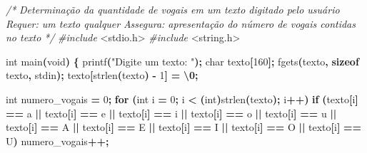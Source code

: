 \documentclass[
  11pt,
  a4paper,
]{scrbook}
\newenvironment{Shaded}{\begin{snugshade}}{\end{snugshade}}
\newcommand{\CharTok}[1]{\textcolor[rgb]{0.31,0.60,0.02}{#1}}
\newcommand{\CommentTok}[1]{\textcolor[rgb]{0.56,0.35,0.01}{\textit{#1}}}
\newcommand{\ControlFlowTok}[1]{\textcolor[rgb]{0.13,0.29,0.53}{\textbf{#1}}}
\newcommand{\DataTypeTok}[1]{\textcolor[rgb]{0.13,0.29,0.53}{#1}}
\newcommand{\DecValTok}[1]{\textcolor[rgb]{0.00,0.00,0.81}{#1}}
\newcommand{\ImportTok}[1]{#1}
\newcommand{\KeywordTok}[1]{\textcolor[rgb]{0.13,0.29,0.53}{\textbf{#1}}}
\newcommand{\NormalTok}[1]{#1}
\newcommand{\OperatorTok}[1]{\textcolor[rgb]{0.81,0.36,0.00}{\textbf{#1}}}
\newcommand{\PreprocessorTok}[1]{\textcolor[rgb]{0.56,0.35,0.01}{\textit{#1}}}
\newcommand{\SpecialCharTok}[1]{\textcolor[rgb]{0.81,0.36,0.00}{\textbf{#1}}}
\newcommand{\StringTok}[1]{\textcolor[rgb]{0.31,0.60,0.02}{#1}}
\begin{document}
\begin{Shaded}
\begin{Highlighting}[]
\CommentTok{/*}
\CommentTok{Determinação da quantidade de vogais em um texto digitado pelo usuário}
\CommentTok{Requer: um texto qualquer}
\CommentTok{Assegura: apresentação do número de vogais contidas no texto}
\CommentTok{*/}
\PreprocessorTok{\#include }\ImportTok{\textless{}stdio.h\textgreater{}}
\PreprocessorTok{\#include }\ImportTok{\textless{}string.h\textgreater{}}

\DataTypeTok{int}\NormalTok{ main}\OperatorTok{(}\DataTypeTok{void}\OperatorTok{)} \OperatorTok{\{}
\NormalTok{    printf}\OperatorTok{(}\StringTok{"Digite um texto: "}\OperatorTok{);}
    \DataTypeTok{char}\NormalTok{ texto}\OperatorTok{[}\DecValTok{160}\OperatorTok{];}
\NormalTok{    fgets}\OperatorTok{(}\NormalTok{texto}\OperatorTok{,} \KeywordTok{sizeof}\NormalTok{ texto}\OperatorTok{,}\NormalTok{ stdin}\OperatorTok{);}
\NormalTok{    texto}\OperatorTok{[}\NormalTok{strlen}\OperatorTok{(}\NormalTok{texto}\OperatorTok{)} \OperatorTok{{-}} \DecValTok{1}\OperatorTok{]} \OperatorTok{=} \CharTok{\textquotesingle{}}\SpecialCharTok{\textbackslash{}0}\CharTok{\textquotesingle{}}\OperatorTok{;}

    \DataTypeTok{int}\NormalTok{ numero\_vogais }\OperatorTok{=} \DecValTok{0}\OperatorTok{;}
    \ControlFlowTok{for} \OperatorTok{(}\DataTypeTok{int}\NormalTok{ i }\OperatorTok{=} \DecValTok{0}\OperatorTok{;}\NormalTok{ i }\OperatorTok{\textless{}} \OperatorTok{(}\DataTypeTok{int}\OperatorTok{)}\NormalTok{strlen}\OperatorTok{(}\NormalTok{texto}\OperatorTok{);}\NormalTok{ i}\OperatorTok{++)}
        \ControlFlowTok{if} \OperatorTok{(}\NormalTok{texto}\OperatorTok{[}\NormalTok{i}\OperatorTok{]} \OperatorTok{==} \CharTok{\textquotesingle{}a\textquotesingle{}} \OperatorTok{||}\NormalTok{ texto}\OperatorTok{[}\NormalTok{i}\OperatorTok{]} \OperatorTok{==} \CharTok{\textquotesingle{}e\textquotesingle{}} \OperatorTok{||}\NormalTok{ texto}\OperatorTok{[}\NormalTok{i}\OperatorTok{]} \OperatorTok{==} \CharTok{\textquotesingle{}i\textquotesingle{}} \OperatorTok{||}
\NormalTok{             texto}\OperatorTok{[}\NormalTok{i}\OperatorTok{]} \OperatorTok{==} \CharTok{\textquotesingle{}o\textquotesingle{}} \OperatorTok{||}\NormalTok{ texto}\OperatorTok{[}\NormalTok{i}\OperatorTok{]} \OperatorTok{==} \CharTok{\textquotesingle{}u\textquotesingle{}} \OperatorTok{||}\NormalTok{ texto}\OperatorTok{[}\NormalTok{i}\OperatorTok{]} \OperatorTok{==} \CharTok{\textquotesingle{}A\textquotesingle{}} \OperatorTok{||}
\NormalTok{             texto}\OperatorTok{[}\NormalTok{i}\OperatorTok{]} \OperatorTok{==} \CharTok{\textquotesingle{}E\textquotesingle{}} \OperatorTok{||}\NormalTok{ texto}\OperatorTok{[}\NormalTok{i}\OperatorTok{]} \OperatorTok{==} \CharTok{\textquotesingle{}I\textquotesingle{}} \OperatorTok{||}\NormalTok{ texto}\OperatorTok{[}\NormalTok{i}\OperatorTok{]} \OperatorTok{==} \CharTok{\textquotesingle{}O\textquotesingle{}} \OperatorTok{||}
\NormalTok{             texto}\OperatorTok{[}\NormalTok{i}\OperatorTok{]} \OperatorTok{==} \CharTok{\textquotesingle{}U\textquotesingle{}}\OperatorTok{)}
\NormalTok{            numero\_vogais}\OperatorTok{++;}


\end{Highlighting}
\end{Shaded}
\end{document}
